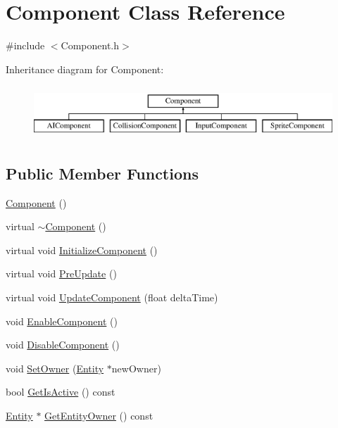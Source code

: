 \hypertarget{class_component}{}\section{Component Class Reference}
\label{class_component}


{\ttfamily \#include $<$Component.\+h$>$}

Inheritance diagram for Component\+:\begin{figure}[H]
\begin{center}
\leavevmode
\includegraphics[height=2.000000cm]{class_component}
\end{center}
\end{figure}
\subsection*{Public Member Functions}
\begin{DoxyCompactItemize}
\item 
\mbox{\hyperlink{class_component_a8775db6d1a2c1afc2e77cd3c8f39da6f}{Component}} ()
\item 
virtual \mbox{\hyperlink{class_component_ab8378fa275af98e568a7e91d33d867af}{$\sim$\+Component}} ()
\item 
virtual void \mbox{\hyperlink{class_component_a65053e7e92ff6344e6b028111e43c3c9}{Initialize\+Component}} ()
\item 
virtual void \mbox{\hyperlink{class_component_a7866088cbcf6713821951955eadc85ce}{Pre\+Update}} ()
\item 
virtual void \mbox{\hyperlink{class_component_a8afb7c9504f763728bfedf642cfc5f43}{Update\+Component}} (float delta\+Time)
\item 
void \mbox{\hyperlink{class_component_adccde1de0f593815f081c7df620becbe}{Enable\+Component}} ()
\item 
void \mbox{\hyperlink{class_component_abe8c32edb2ca2b367223ed1f183dc512}{Disable\+Component}} ()
\item 
void \mbox{\hyperlink{class_component_afe37d738fe82aa6b77d7e7398651aa78}{Set\+Owner}} (\mbox{\hyperlink{class_entity}{Entity}} $\ast$new\+Owner)
\item 
bool \mbox{\hyperlink{class_component_acc8b4b096202b1b981973eee31bd682e}{Get\+Is\+Active}} () const
\item 
\mbox{\hyperlink{class_entity}{Entity}} $\ast$ \mbox{\hyperlink{class_component_a7bd8639dadfcaef6baaff8c3b17ae5e6}{Get\+Entity\+Owner}} () const
\end{DoxyCompactItemize}
